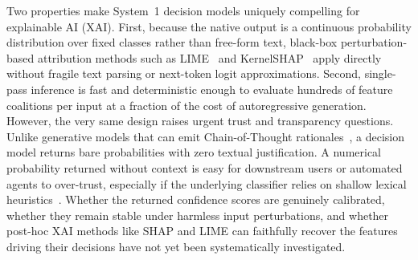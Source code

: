 \documentclass[10pt]{article}
\begin{document}
Two properties make System~1 decision models uniquely compelling for explainable AI (XAI).
First, because the native output is a continuous probability distribution over fixed classes rather than free-form text, black-box perturbation-based attribution methods such as LIME~\cite{ribeiro2016} and KernelSHAP~\cite{lundberg2017} apply directly without fragile text parsing or next-token logit approximations.
Second, single-pass inference is fast and deterministic enough to evaluate hundreds of feature coalitions per input at a fraction of the cost of autoregressive generation.
However, the very same design raises urgent trust and transparency questions.
Unlike generative models that can emit Chain-of-Thought rationales~\cite{wei2022cot}, a decision model returns bare probabilities with zero textual justification.
A numerical probability returned without context is easy for downstream users or automated agents to over-trust, especially if the underlying classifier relies on shallow lexical heuristics~\cite{geirhos2020,mccoy2019}.
Whether the returned confidence scores are genuinely calibrated, whether they remain stable under harmless input perturbations, and whether post-hoc XAI methods like SHAP and LIME can faithfully recover the features driving their decisions have not yet been systematically investigated.
\end{document}
